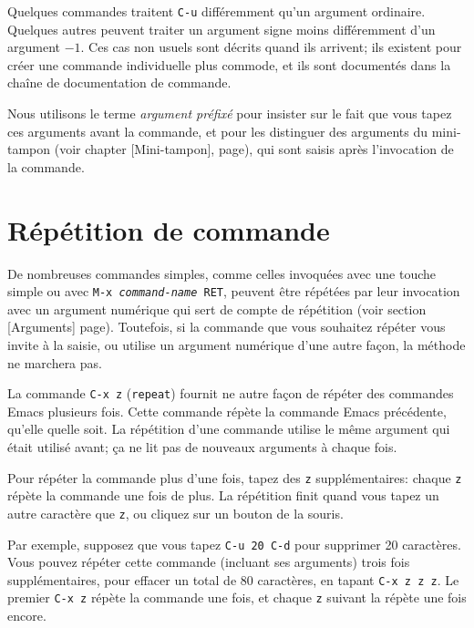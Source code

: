 Quelques commandes traitent \texttt{C-u} différemment qu'un argument
ordinaire. Quelques autres peuvent traiter un argument signe moins
différemment d'un argument $-1$. Ces cas non usuels sont décrits quand
ils arrivent; ils existent pour créer une commande individuelle plus
commode, et ils sont documentés dans la chaîne de documentation de
commande.\par 

Nous utilisons le terme \emph{argument préfixé} pour insister sur le
fait que vous tapez ces arguments avant la commande, et pour
les distinguer des arguments du mini-tampon (voir chapter
[Mini-tampon], page), qui sont saisis après l'invocation de la
commande.\par 

\section{Répétition de commande}

De nombreuses commandes simples, comme celles invoquées avec une touche
simple ou avec \texttt{M-x \emph{command-name} RET}, peuvent être
répétées par leur invocation avec un argument numérique qui sert de
compte de répétition (voir section [Arguments]
page). Toutefois, si la commande que vous souhaitez
répéter vous invite à la saisie, ou utilise un argument numérique
d'une autre façon, la méthode ne marchera pas.\par

La commande \texttt{C-x z} (\texttt{repeat}) fournit ne autre façon de
répéter des commandes Emacs plusieurs fois. Cette commande répète la
commande Emacs précédente, qu'elle quelle soit. La répétition d'une
commande utilise le même argument qui était utilisé avant; \c{c}a ne
lit pas de nouveaux arguments à chaque fois.\par

Pour répéter la commande plus d'une fois, tapez des \texttt{z}
supplémentaires: chaque \texttt{z} répète la commande une fois de
plus. La répétition finit quand vous tapez un autre caractère que
\texttt{z}, ou cliquez sur un bouton de la souris.\par

Par exemple, supposez que vous tapez \texttt{C-u 20 C-d} pour
supprimer 20 caractères. Vous pouvez répéter cette commande (incluant
ses arguments) trois fois supplémentaires, pour effacer un total de 80
caractères, en tapant \texttt{C-x z z z}. Le premier \texttt{C-x z}
répète la commande une fois, et chaque \texttt{z} suivant la répète
une fois encore.\par
\newpage 